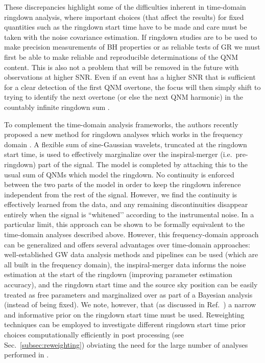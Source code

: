 These discrepancies highlight some of the difficulties inherent in time-domain ringdown analysis, where important choices (that affect the results) for fixed quantities such as the ringdown start time have to be made and care must be taken with the noise covariance estimation.
If ringdown studies are to be used to make precision measurements of BH properties or as reliable tests of GR we must first be able to make reliable and reproducible determinations of the QNM content.
This is also not a problem that will be removed in the future with observations at higher SNR. Even if an event has a higher SNR that is sufficient for a clear detection of the first QNM overtone, the focus will then simply shift to trying to identify the next overtone (or else the next QNM harmonic) in the countably infinite ringdown sum \cite{Bustillo:2020buq}.

To complement the time-domain analysis frameworks, the authors recently proposed a new method for ringdown analyses which works in the frequency domain \cite{Finch:2021qph}.
A flexible sum of sine-Gaussian wavelets, truncated at the ringdown start time, is used to effectively marginalize over the inspiral-merger (i.e.\ pre-ringdown) part of the signal.
The model is completed by attaching this to the usual sum of QNMs which model the ringdown.
No continuity is enforced between the two parts of the model in order to keep the ringdown inference independent from the rest of the signal.
However, we find the continuity is effectively learned from the data, and any remaining discontinuities disappear entirely when the signal is ``whitened’’ according to the instrumental noise.
In a particular limit, this approach can be shown to be formally equivalent to the time-domain analyses described above.
However, this frequency-domain approach can be generalized and offers several advantages over time-domain approaches:
well-established GW data analysis methods and pipelines can be used (which are all built in the frequency domain), 
the inspiral-merger data informs the noise estimation at the start of the ringdown (improving parameter estimation accuracy), 
and the ringdown start time and the source sky position can be easily treated as free parameters and marginalized over as part of a Bayesian analysis (instead of being fixed).
We note, however, that (as discussed in Ref.~\cite{Finch:2021qph}) a narrow and informative prior on the ringdown start time must be used.
Reweighting techniques can be employed to investigate different ringdown start time prior choices computationally efficiently in post processing (see Sec.~\ref{subsec:reweighting}) obviating the need for the large number of analyses performed in \cite{Cotesta:2022pci, Isi:2022mhy}.

